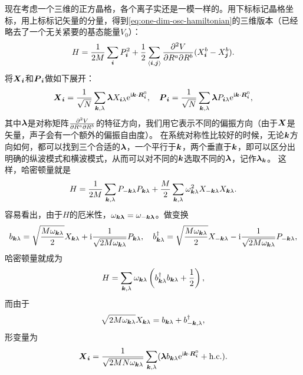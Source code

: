现在考虑一个三维的正方晶格，各个离子实还是一模一样的。用下标标记晶格坐标，用上标标记矢量的分量，得到\eqref{eq:one-dim-osc-hamiltonian}的三维版本（已经略去了一个无关紧要的基态能量$V_0$）：
\begin{equation}
    {H} = \frac{1}{2 M} \sum_{\vb*{i}} {P}_{\vb*{i}}^2 + \frac{1}{2} \sum_{\langle \vb*{i}, \vb*{j} \rangle} \pdv{V}{R^a}{R^b} (X_{\vb*{i}}^a - X_{\vb*{j}}^a) (X_{\vb*{i}}^b - X_{\vb*{j}}^b).
\end{equation}
将$\vb*{X}_{\vb*{i}}$和$\vb*{P}_{\vb*{i}}$做如下展开：
\begin{equation}
    \vb*{X}_{\vb*{i}} = \frac{1}{\sqrt{N}} \sum_{\vb*{k}, \lambda} \vb*{\lambda} X_{\vb*{i} \lambda} \mathrm{e}^{\mathrm{i} \vb*{k} \cdot \vb*{R}_{\vb*{i}}^0}, \quad \vb*{P}_{\vb*{i}} = \frac{1}{\sqrt{N}} \sum_{\vb*{k}, \lambda} \vb*{\lambda} P_{\vb*{i} \lambda} \mathrm{e}^{\mathrm{i} \vb*{k} \cdot \vb*{R}_{\vb*{i}}^0},
\end{equation}
其中$\vb*{\lambda}$是对称矩阵$\pdv{V}{R^a}{R^b}$的特征方向，我们用它表示不同的偏振方向（由于$\vb*{X}$是矢量，声子会有一个额外的偏振自由度）。
在系统对称性比较好的时候，无论$\vb*{k}$方向如何，都可以找到三个合适的$\vb*{\lambda}$，一个平行于$\vb*{k}$，两个垂直于$\vb*{k}$，即可以区分出明确的纵波模式和横波模式，从而可以对不同的$\vb*{k}$选取不同的$\vb*{\lambda}$，记作$\vb*{\lambda}_{\vb*{k}}$。
这样，哈密顿量就是
\begin{equation}
    {H} = \frac{1}{2 M} \sum_{\vb*{k}, \lambda} {P}_{-\vb*{k} \lambda} {P}_{\vb*{k}\lambda} + \frac{M}{2} \sum_{\vb*{k}, \lambda} \omega_{\vb*{k} \lambda}^2 {X}_{-\vb*{k} \lambda} {X}_{\vb*{k} \lambda}.
\end{equation}
容易看出，由于${H}$的厄米性，$\omega_{\vb*{k}\vb*{\lambda}} = \omega_{-\vb*{k} \vb*{\lambda}}$。做变换
\begin{equation}
    {b}_{\vb*{k} \lambda} = \sqrt{\frac{M \omega_{\vb*{k} \lambda}}{2}} {X}_{\vb*{k} \lambda} + \mathrm{i} \frac{1}{\sqrt{2 M \omega_{\vb*{k} \lambda}}} P_{\vb*{k} \lambda}, \quad {b}^\dagger_{\vb*{k} \lambda} = \sqrt{\frac{M \omega_{\vb*{k} \lambda}}{2}} {X}_{- \vb*{k} \lambda} - \mathrm{i} \frac{1}{\sqrt{2 M \omega_{\vb*{k} \lambda}}} P_{- \vb*{k} \lambda},
    \label{eq:transform-b-pq}
\end{equation}
哈密顿量就成为
\begin{equation}
    {H} = \sum_{\vb*{k}, \lambda} \omega_{\vb*{k} \lambda} \left( {b}^\dagger_{\vb*{k} \lambda} {b}_{\vb*{k} \lambda} + \frac{1}{2} \right),
\end{equation}
而由于
\[
    \sqrt{2 M \omega_{\vb*{k} \lambda}} X_{\vb*{k} \lambda} = b_{\vb*{k} \lambda} + b^\dagger_{-\vb*{k}, \lambda},
\]
形变量为
\begin{equation}
    \vb*{X}_{\vb*{i}} = \frac{1}{\sqrt{2 M N \omega_{\vb*{k} \lambda}}} \sum_{\vb*{k}, \lambda} (\vb*{\lambda} b_{\vb*{k} \lambda} \mathrm{e}^{\mathrm{i} \vb*{k} \cdot \vb*{R}^0_{\vb*{i}}} + \text{h.c.}).
    \label{eq:phonon-displacement-general}
\end{equation}

